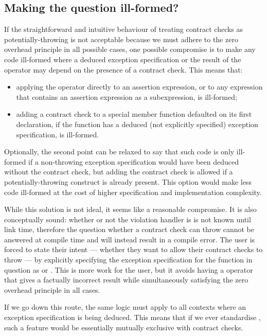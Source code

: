 \subsection{Making the question ill-formed?}

If the straightforward and intuitive behaviour of treating contract checks as potentially-throwing is not acceptable because we must adhere to the zero overhead principle in all possible cases, one possible compromise is to make any code ill-formed where a deduced exception specification or the result of the  operator may depend on the presence of a contract check. This means that:
\begin{itemize}
\item applying the  operator directly to an assertion expression, or to any expression that contains an assertion expression as a subexpression, is ill-formed;
\item adding a contract check to a special member function defaulted on its first declaration, if the function has a deduced (not explicitly specified) exception specification, is ill-formed.
\end{itemize}
Optionally, the second point can be relaxed to say that such code is only ill-formed if a non-throwing exception specification would have been deduced without the contract check, but adding the contract check is allowed if a potentially-throwing construct is already present. This option would make less code ill-formed at the cost of higher specification and implementation complexity.

While this solution is not ideal, it seems like a reasonable compromise. It is also conceptually sound: whether or not the violation handler is  is not known until link time, therefore the question whether a contract check can throw cannot be answered at compile time and will instead result in a compile error. The user is forced to state their intent --- whether they want to allow their contract checks to throw --- by explicitly specifying the exception specification for the function in question as  or . This is more work for the user, but it avoids having a  operator that gives a factually incorrect result while simultaneously satisfying the zero overhead principle in all cases.

If we go down this route, the same logic must apply to all contexts where an exception specification is being deduced. This means that if we ever standardise , such a feature would be essentially mutually exclusive with contract checks.

